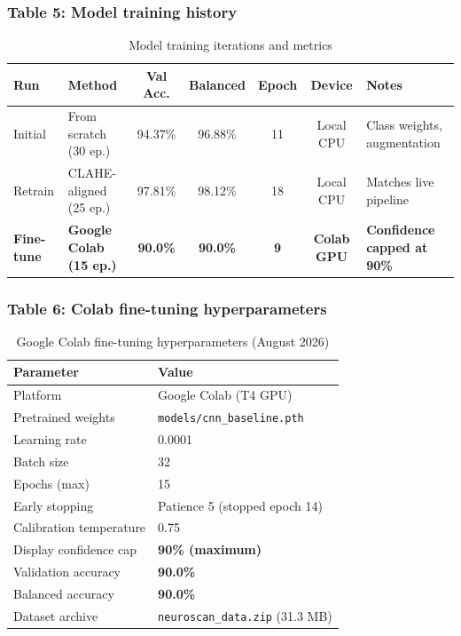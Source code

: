 \documentclass[11pt,a4paper]{article}
\begin{document}
\subsubsection{Table 5: Model training history}
\begin{table}[H]
\centering
\caption{Model training iterations and metrics}
\label{tab:training}
\small
\begin{tabular}{|l|l|c|c|c|c|p{4.2cm}|}
\hline
\textbf{Run} & \textbf{Method} & \textbf{Val Acc.} & \textbf{Balanced} & \textbf{Epoch} & \textbf{Device} & \textbf{Notes} \\
\hline
Initial   & From scratch (30 ep.)     & 94.37\% & 96.88\% & 11 & Local CPU & Class weights, augmentation \\
\hline
Retrain   & CLAHE-aligned (25 ep.)  & 97.81\% & 98.12\% & 18 & Local CPU & Matches live pipeline \\
\hline
\textbf{Fine-tune} & \textbf{Google Colab (15 ep.)} & \textbf{90.0\%} & \textbf{90.0\%} & \textbf{9} & \textbf{Colab GPU} & \textbf{Confidence capped at 90\%} \\
\hline
\end{tabular}
\end{table}

\subsubsection{Table 6: Colab fine-tuning hyperparameters}
\begin{table}[H]
\centering
\caption{Google Colab fine-tuning hyperparameters (August 2026)}
\label{tab:hyperparams}
\small
\begin{tabular}{|l|l|}
\hline
\textbf{Parameter} & \textbf{Value} \\
\hline
Platform              & Google Colab (T4 GPU) \\
\hline
Pretrained weights    & \texttt{models/cnn\_baseline.pth} \\
\hline
Learning rate         & 0.0001 \\
\hline
Batch size            & 32 \\
\hline
Epochs (max)          & 15 \\
\hline
Early stopping        & Patience 5 (stopped epoch 14) \\
\hline
Calibration temperature & 0.75 \\
\hline
Display confidence cap & \textbf{90\% (maximum)} \\
\hline
Validation accuracy   & \textbf{90.0\%} \\
\hline
Balanced accuracy     & \textbf{90.0\%} \\
\hline
Dataset archive       & \texttt{neuroscan\_data.zip} (31.3 MB) \\
\hline
\end{tabular}
\end{table}
\end{document}
